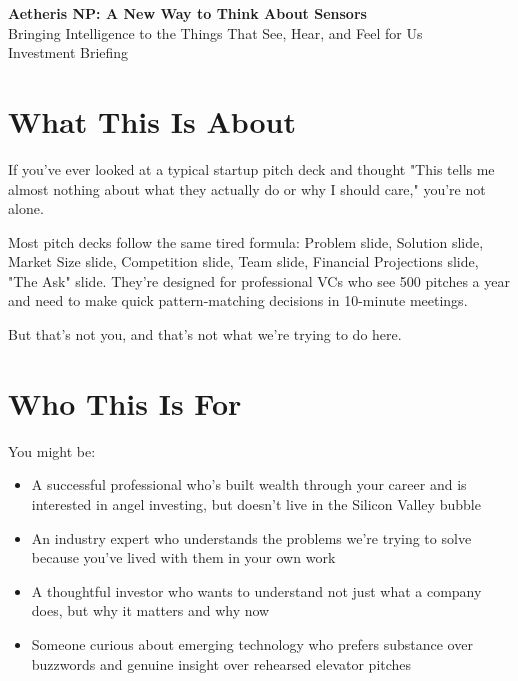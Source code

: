 \documentclass[11pt,letterpaper]{article}
\begin{document}
\begin{center}
    {\Huge\color{darkblue}\textbf{Aetheris NP: A New Way to Think About Sensors}}\\
    \vspace{4pt}
    {\large\color{mediumgray}Bringing Intelligence to the Things That See, Hear, and Feel for Us}\\
    \vspace{2pt}
    {\footnotesize\color{mediumgray}Investment Briefing}
\end{center}

\section*{What This Is About}

If you've ever looked at a typical startup pitch deck and thought "This tells me almost nothing about what they actually do or why I should care," you're not alone.

Most pitch decks follow the same tired formula: Problem slide, Solution slide, Market Size slide, Competition slide, Team slide, Financial Projections slide, "The Ask" slide. They're designed for professional VCs who see 500 pitches a year and need to make quick pattern-matching decisions in 10-minute meetings.

But that's not you, and that's not what we're trying to do here.

\section*{Who This Is For}

You might be:
\begin{itemize}[leftmargin=10pt, itemsep=1pt]
    \item A successful professional who's built wealth through your career and is interested in angel investing, but doesn't live in the Silicon Valley bubble
    \item An industry expert who understands the problems we're trying to solve because you've lived with them in your own work
    \item A thoughtful investor who wants to understand not just what a company does, but why it matters and why now
    \item Someone curious about emerging technology who prefers substance over buzzwords and genuine insight over rehearsed elevator pitches
\end{itemize}
\end{document}
